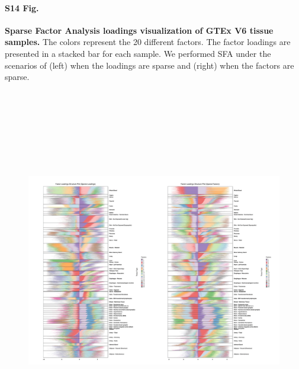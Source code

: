 \documentclass[10pt,letterpaper]{article}
\begin{document}
\paragraph*{S14 Fig.}

\label{figS14}
{\bf Sparse Factor Analysis loadings visualization of GTEx V6 tissue samples.} The colors represent the 20 different factors. The factor loadings are presented in a stacked bar for each sample. We performed SFA under the scenarios of (left) when the loadings are sparse and (right) when the factors are sparse.
\begin{figure}[ht]
\centering
\includegraphics[height=6.3in, width=7in]{../../plots/gtex-figures/sfa_gtex_figs.png}
\end{figure}
\end{document}
